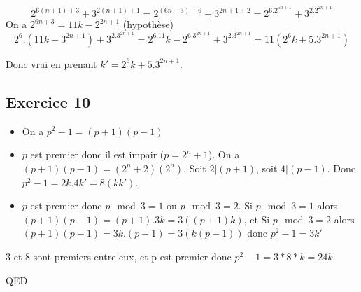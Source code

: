 \documentclass[]{book}
\theoremstyle{definition}
\begin{document}
$$2^{6(n+1)+3}+3^{2(n+1)+1} = 2^{(6n+3)+6}+3^{2n+1+2} = 2^6.2^{6n+1}+3^2.2^{2n+1}$$
On a $2^{6n+3} = 11k - 2^{2n+1}$ (hypoth\`ese)
$$2^6.(11k - 3^{2n+1}) + 3^2.3^{2n+1} = 2^6.11k - 2^6.3^{2n+1} + 3^2.3^{2n+1} = 11(2^6k+5.3^{2n+1})$$

Donc vrai en prenant $k' = 2^6k+5.3^{2n+1}$.


\subsection*{Exercice 10}
\begin{itemize}
\item On a $p^2-1 = (p+1)(p-1)$
\item $p$ est premier donc il est impair ($p=2^n+1$). On a $(p+1)(p-1) = (2^n+2)(2^n)$. Soit $2|(p+1)$, soit $4|(p-1)$. Donc $p^2-1=2k.4k' = 8(kk')$.
\item $p$ est premier donc $p \mod 3 =1$ ou $p \mod 3 =2$. Si $p \mod 3 =1$  alors $(p+1)(p-1) = (p+1).3k = 3((p+1)k)$, et Si $p \mod 3 =2$  alors $(p+1)(p-1) = 3k.(p-1) = 3(k(p-1))$ donc $p^2-1 = 3k'$
\end{itemize}

3 et 8 sont premiers entre eux, et p est premier donc $p^2-1=3*8*k = 24k$.

QED
\end{document}
